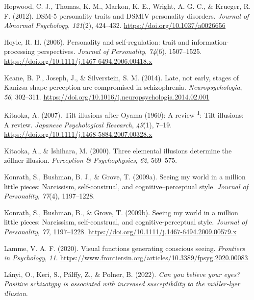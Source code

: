 \documentclass[
  man,floatsintext]{apa6}
\newlength{\cslhangindent}
\newlength{\cslentryspacingunit} %
\newenvironment{CSLReferences}[2] %
 {%
  \setlength{\parindent}{0pt}
  \ifodd #1
  \let\oldpar\par
  \def\par{\hangindent=\cslhangindent\oldpar}
  \fi
  \setlength{\parskip}{#2\cslentryspacingunit}
 }%
 {}
\begin{document}
\begin{CSLReferences}{1}{0}
\leavevmode{}%
Hopwood, C. J., Thomas, K. M., Markon, K. E., Wright, A. G. C., \& Krueger, R. F. (2012). DSM-5 personality traits and DSM{\textendash}IV personality disorders. \emph{Journal of Abnormal Psychology}, \emph{121}(2), 424--432. \url{https://doi.org/10.1037/a0026656}

\leavevmode{}%
Hoyle, R. H. (2006). Personality and self-regulation: trait and information-processing perspectives. \emph{Journal of Personality}, \emph{74}(6), 1507--1525. \url{https://doi.org/10.1111/j.1467-6494.2006.00418.x}

\leavevmode{}%
Keane, B. P., Joseph, J., \& Silverstein, S. M. (2014). Late, not early, stages of Kanizsa shape perception are compromised in schizophrenia. \emph{Neuropsychologia}, \emph{56}, 302--311. \url{https://doi.org/10.1016/j.neuropsychologia.2014.02.001}

\leavevmode{}%
Kitaoka, A. (2007). Tilt illusions after Oyama (1960): A review {\textsuperscript{1}}: Tilt illusions: A review. \emph{Japanese Psychological Research}, \emph{49}(1), 7--19. \url{https://doi.org/10.1111/j.1468-5884.2007.00328.x}

\leavevmode{}%
Kitaoka, A., \& Ishihara, M. (2000). Three elemental illusions determine the zöllner illusion. \emph{Perception \& Psychophysics}, \emph{62}, 569--575.

\leavevmode{}%
Konrath, S., Bushman, B. J., \& Grove, T. (2009a). Seeing my world in a million little pieces: Narcissism, self-construal, and cognitive--perceptual style. \emph{Journal of Personality}, \emph{77}(4), 1197--1228.

\leavevmode{}%
Konrath, S., Bushman, B., \& Grove, T. (2009b). Seeing my world in a million little pieces: Narcissism, self-construal, and cognitive-perceptual style. \emph{Journal of Personality}, \emph{77}, 1197--1228. \url{https://doi.org/10.1111/j.1467-6494.2009.00579.x}

\leavevmode{}%
Lamme, V. A. F. (2020). Visual functions generating conscious seeing. \emph{Frontiers in Psychology}, \emph{11}. \url{https://www.frontiersin.org/articles/10.3389/fpsyg.2020.00083}

\leavevmode{}%
Lányi, O., Keri, S., Pálffy, Z., \& Polner, B. (2022). \emph{Can you believe your eyes? Positive schizotypy is associated with increased susceptibility to the m{ü}ller-lyer illusion}.


\end{CSLReferences}
\end{document}

